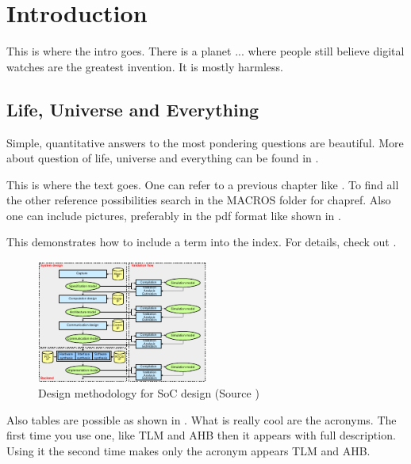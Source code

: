 
\chapter{Introduction}
\label{chap:intro}
This is where the intro goes. 
There is a planet ... where people still believe digital watches are the 
greatest invention. It is mostly harmless. 

\section{Life, Universe and Everything}
\label{chap:intro:design}

Simple, quantitative answers to the most pondering questions are beautiful. More about question of life, universe and everything can be found in \cite{book:42}.

This is where the text goes. One can refer to a previous chapter like . To find all the other reference possibilities search in the MACROS folder for chapref. Also one can include pictures, preferably in the pdf format like shown in .

This demonstrates how to include a term into the index. For details, check out \cite{latex:index}.

\begin{figure}[htbp]
  \centering
    \includegraphics[width=0.5\textwidth]{fig/meth.pdf}
  \caption[Design methodology for SoC design]{\label{fig:intro:meth} Design methodology for SoC design (Source \cite{book:SpecC:yellow})}
\end{figure}

Also tables are possible as shown in . What is really cool are the acronyms. The first time you use one, like \ac{TLM} and \ac{AHB} then it appears with full description. Using it the second time makes only the acronym appears \ac{TLM} and \ac{AHB}.

